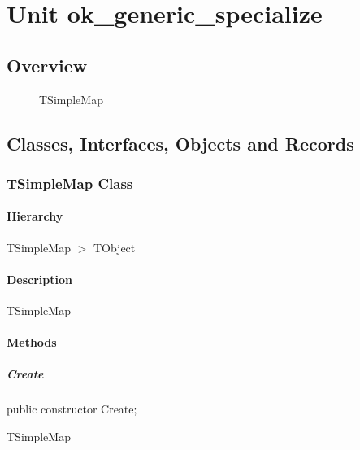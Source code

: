\documentclass{report}
\begin{document}
\newlength{\tmplength}
\chapter{Unit ok{\_}generic{\_}specialize}
\section{Overview}
\begin{description}
\item[\texttt{\begin{ttfamily}TSimpleMap\end{ttfamily} Class}]TSimpleMap
\end{description}
\section{Classes, Interfaces, Objects and Records}
\subsection*{TSimpleMap Class}
\subsubsection*{\large{\textbf{Hierarchy}}\normalsize\hspace{1ex}\hfill}
TSimpleMap {$>$} TObject
\subsubsection*{\large{\textbf{Description}}\normalsize\hspace{1ex}\hfill}
TSimpleMap\subsubsection*{\large{\textbf{Methods}}\normalsize\hspace{1ex}\hfill}
\paragraph*{Create}\hspace*{\fill}

\begin{list}{}{
\setlength{\itemindent}{0cm}
\setlength{\listparindent}{0cm}
\setlength{\leftmargin}{\evensidemargin}
\addtolength{\leftmargin}{\tmplength}
\settowidth{\labelsep}{X}
\addtolength{\leftmargin}{\labelsep}
\setlength{\labelwidth}{\tmplength}
}
\begin{flushleft}
\item[\textbf{Declaration}\hfill]
\begin{ttfamily}
public constructor Create;\end{ttfamily}


\end{flushleft}
\par
\item[\textbf{Description}]
TSimpleMap

\end{list}
\end{document}
